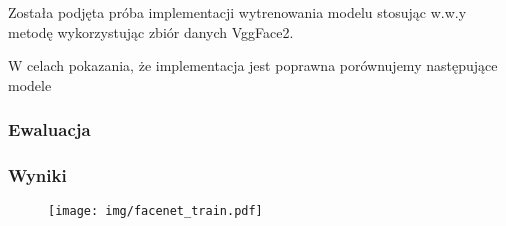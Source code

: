 Została podjęta próba implementacji wytrenowania modelu stosując w.w.y metodę wykorzystując zbiór danych VggFace2. 

W celach pokazania, że implementacja jest poprawna porównujemy następujące modele

\subsubsection{Ewaluacja}


\subsubsection{Wyniki}

\begin{figure}[h]
  \centering
  \texttt{[image: img/facenet\_train.pdf]}
  \caption{\fedavglong}%
  \label{fig:facenet_train}%
\end{figure}



